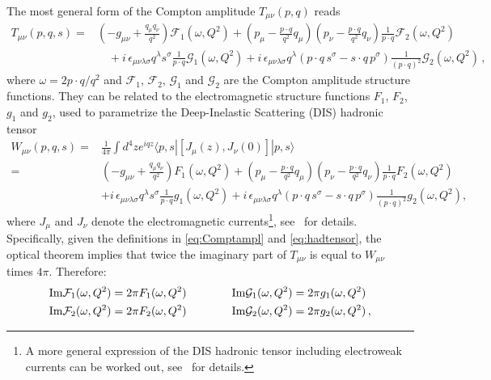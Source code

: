 The most general form of the Compton amplitude $T_{\mu\nu}(p,q)$ 
reads~\cite{Manohar:1992tz}
\begin{align}
T_{\mu\nu}(p,q,s) 
= {} & 
  \left(-g_{\mu\nu}+\frac{q_\mu q_\nu}{q^2}\right)\mathcal{F}_1(\omega,Q^2) 
+ \left(p_\mu-\frac{p\cdot q}{q^2}q_\mu\right) \left(p_\nu-\frac{p\cdot q}{q^2}q_\nu\right) \frac{1}{p\cdot q} \mathcal{F}_2(\omega,Q^2)
\nonumber\\ 
& {} \quad  
+ i\,\epsilon_{\mu\nu\lambda\sigma}q^\lambda s^\sigma \frac{1}{p\cdot q}\mathcal{G}_1(\omega,Q^2)
+ i\,\epsilon_{\mu\nu\lambda\sigma}q^\lambda \left(p\cdot q\, s^\sigma - s\cdot q\, p^\sigma\right) \frac{1}{(p\cdot q)^2}\mathcal{G}_2(\omega,Q^2)\,,
\label{eq:Comptampl}
\end{align}
where $\omega=2p\cdot q/q^2$ and $\mathcal{F}_1$, $\mathcal{F}_2$, 
$\mathcal{G}_1$ and $\mathcal{G}_2$ are the Compton amplitude structure 
functions.
%
They can be related to the electromagnetic structure functions
$F_1$, $F_2$, $g_1$ and $g_2$, used to parametrize the Deep-Inelastic 
Scattering (DIS) hadronic tensor
\begin{align}
W_{\mu\nu}(p,q,s)
= {} &
\frac{1}{4\pi}\int d^4z e^{iqz}\langle p,s |[J_\mu(z),J_\nu(0)]|p,s\rangle
\nonumber
\\
= {} &
\left(-g_{\mu\nu} +  \frac{q_\mu q_\nu}{q^2}\right) F_1(\omega,Q^2)
+\left( p_\mu - \frac{p\cdot q}{q^2}q_\mu \right)
 \left(p_\nu - \frac{p\cdot q}{q^2}q_\nu \right) \frac{1}{p\cdot q}
F_2(\omega, Q^2)
\nonumber
\\
& +i\,\epsilon_{\mu\nu\lambda\sigma}q^\lambda s^\sigma
\frac{1}{p\cdot q} g_1(\omega,Q^2)
+ i\,\epsilon_{\mu\nu\lambda\sigma}q^\lambda(p\cdot q\, s^\sigma - s\cdot q\, p^\sigma)
\frac{1}{(p\cdot q)^2}g_2(\omega,Q^2),
\label{eq:hadtensor}
\end{align}
where $J_\mu$ and $J_\nu$ denote the electromagnetic currents\footnote{A more
 general expression of the DIS hadronic tensor including electroweak currents
 can be worked out, see~\cite{Anselmino:1993tc,Anselmino:1992rn} for 
 details.}, see~\cite{Anselmino:1992rn,Manohar:1992tz} for details.
%
Specifically, given the definitions in \eqref{eq:Comptampl} and 
\eqref{eq:hadtensor}, the optical theorem implies that twice the imaginary 
part of $T_{\mu\nu}$ is equal to $W_{\mu\nu}$ times $4\pi$.
%
Therefore:
\begin{align}
{\rm Im}\mathcal{F}_1(\omega, Q^2) = 2\pi F_1(\omega,Q^2)
\qquad \qquad &
{\rm Im}\mathcal{G}_1(\omega, Q^2) = 2\pi g_1(\omega,Q^2)
\\
{\rm Im}\mathcal{F}_2(\omega, Q^2) = 2\pi F_2(\omega,Q^2)
\qquad \qquad &
{\rm Im}\mathcal{G}_2(\omega, Q^2) = 2\pi g_2(\omega,Q^2)\, ,
\end{align}
